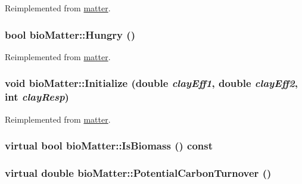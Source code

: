 Reimplemented from \hyperlink{classmatter_ad4e8182423face98b556a4620437ade7}{matter}.\hypertarget{classbio_matter_a35a43ac5963539bf7a22c28084ae4ff6}{
\subsubsection[{Hungry}]{\setlength{\rightskip}{0pt plus 5cm}bool bioMatter::Hungry ()}}
\label{classbio_matter_a35a43ac5963539bf7a22c28084ae4ff6}


Reimplemented from \hyperlink{classmatter_a59b4566b93dd22923b97976c752783ef}{matter}.\hypertarget{classbio_matter_a6d9aa5ce1a57e75f81c034f98bef428a}{
\subsubsection[{Initialize}]{\setlength{\rightskip}{0pt plus 5cm}void bioMatter::Initialize (double {\em clayEff1}, \/  double {\em clayEff2}, \/  int {\em clayResp})}}
\label{classbio_matter_a6d9aa5ce1a57e75f81c034f98bef428a}


Reimplemented from \hyperlink{classmatter_adeae5b9c4239d6c02c19e04d346e6d10}{matter}.\hypertarget{classbio_matter_a0d7bb17bd17f03b79294753f8ffdd394}{
\subsubsection[{IsBiomass}]{\setlength{\rightskip}{0pt plus 5cm}virtual bool bioMatter::IsBiomass () const}}
\label{classbio_matter_a0d7bb17bd17f03b79294753f8ffdd394}
\hypertarget{classbio_matter_a3aed8f9e9d66c1c12491ace5f15439f5}{
\subsubsection[{PotentialCarbonTurnover}]{\setlength{\rightskip}{0pt plus 5cm}virtual double bioMatter::PotentialCarbonTurnover ()}}
\label{classbio_matter_a3aed8f9e9d66c1c12491ace5f15439f5}


